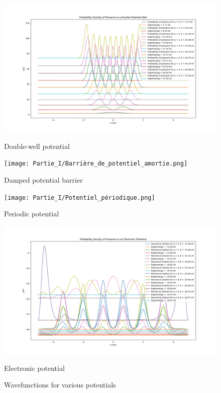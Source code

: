 \documentclass[12pt,french]{article}
\begin{document}
\begin{figure}[h!]
  \centering
  \begin{minipage}[b]{0.45\linewidth}
  \centering
  \includegraphics[width=\linewidth]{Partie_I/Double_Potential_Well.png}
  \caption{Double-well potential}
  \label{fig:double-well}
  \end{minipage}
  \hfill
  \begin{minipage}[b]{0.45\linewidth}
  \centering
  \texttt{[image: Partie\_I/Barrière\_de\_potentiel\_amortie.png]}
  \caption{Damped potential barrier}
  \label{fig:damped-barrier}
  \end{minipage}
  \vfill
  \begin{minipage}[b]{0.45\linewidth}
  \centering
  \texttt{[image: Partie\_I/Potentiel\_périodique.png]}
  \caption{Periodic potential}
  \label{fig:periodic-potential}
  \end{minipage}
  \hfill
  \begin{minipage}[b]{0.45\linewidth}
  \centering
  \includegraphics[width=\linewidth]{Partie_I/Potentiel_electronique.png}
  \caption{Electronic potential}
  \label{fig:electronic-potential}
  \end{minipage}
  \caption{Wavefunctions for various potentials}
  \label{fig:wavefunctions}
\end{figure}
  
\end{document}

